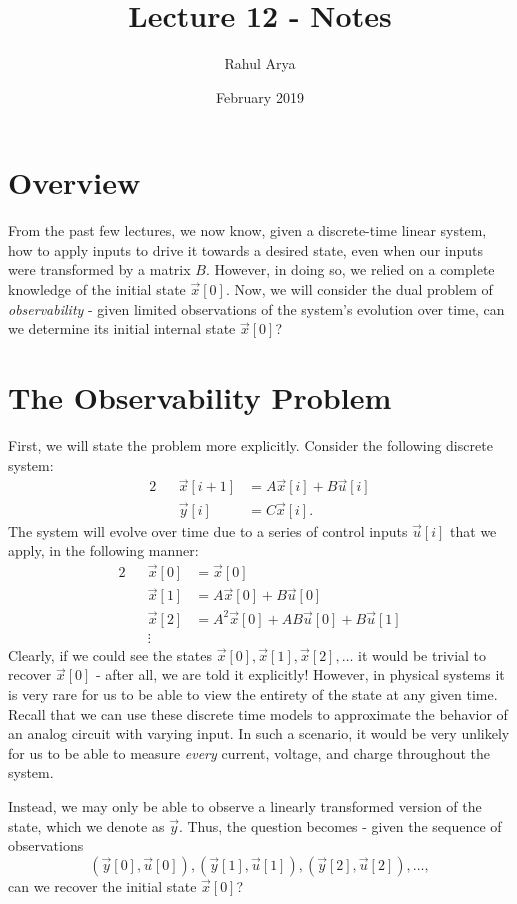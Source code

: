 \documentclass[letterpaper]{article}
\title{Lecture 12 - Notes}
\author{Rahul Arya}
\date{February 2019}
\theoremstyle{remark}
\newcommand{\eqn}[1]{\begin{alignat*}{2}#1\end{alignat*}}
\begin{document}
\maketitle

\section{Overview}
From the past few lectures, we now know, given a discrete-time linear system, how to apply inputs to drive it towards a desired state, even when our inputs were transformed by a matrix $B$. However, in doing so, we relied on a complete knowledge of the initial state $\vec{x}[0]$. Now, we will consider the dual problem of \emph{observability} - given limited observations of the system's evolution over time, can we determine its initial internal state $\vec{x}[0]$?

\section{The Observability Problem}
First, we will state the problem more explicitly. Consider the following discrete system:
\eqn{
    && \vec{x}[i + 1] &= A\vec{x}[i] + B\vec{u}[i] \\
    && \vec{y}[i] &= C\vec{x}[i].
}
The system will evolve over time due to a series of control inputs $\vec{u}[i]$ that we apply, in the following manner:
\eqn{
    && \vec{x}[0] &= \vec{x}[0] \\
    && \vec{x}[1] &= A\vec{x}[0] + B\vec{u}[0] \\
    && \vec{x}[2] &= A^2\vec{x}[0] + AB\vec{u}[0] + B\vec{u}[1] \\
    && \vdots &
}
Clearly, if we could see the states $\vec{x}[0], \vec{x}[1], \vec{x}[2], \ldots$ it would be trivial to recover $\vec{x}[0]$ - after all, we are told it explicitly! However, in physical systems it is very rare for us to be able to view the entirety of the state at any given time. Recall that we can use these discrete time models to approximate the behavior of an analog circuit with varying input. In such a scenario, it would be very unlikely for us to be able to measure \emph{every} current, voltage, and charge throughout the system.

Instead, we may only be able to observe a linearly transformed version of the state, which we denote as $\vec{y}$. Thus, the question becomes - given the sequence of observations
\[
    (\vec{y}[0], \vec{u}[0]), (\vec{y}[1], \vec{u}[1]), (\vec{y}[2], \vec{u}[2]), \ldots,
\]
can we recover the initial state $\vec{x}[0]$?
\end{document}
